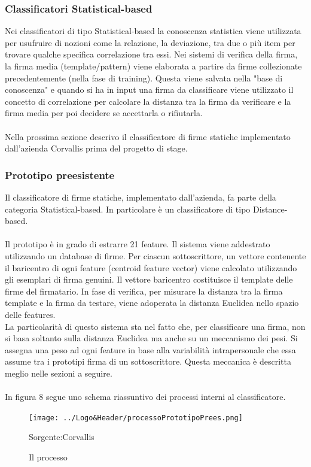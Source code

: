 \subsubsection*{Classificatori Statistical-based}
\label{2.1.3.2}
Nei classificatori di tipo Statistical-based la conoscenza statistica viene utilizzata per usufruire di nozioni come la relazione, la deviazione, tra due o più item per trovare qualche specifica correlazione tra essi. Nei sistemi di verifica della firma, la firma media (template/pattern) viene elaborata a partire da firme collezionate precedentemente (nella fase di training). Questa viene salvata nella "base di conoscenza" e quando si ha in input una firma da classificare viene utilizzato il concetto di correlazione per calcolare la distanza tra la firma da verificare e la firma media per poi decidere se accettarla o rifiutarla.\\\\
Nella prossima sezione descrivo il classificatore di firme statiche implementato dall'azienda Corvallis prima del progetto di stage.
\subsubsection{Prototipo preesistente}
\label{2.1.4}
Il classificatore di firme statiche, implementato dall'azienda, fa parte della categoria Statistical-based. In particolare è un classificatore di tipo Distance-based.\\\\
Il prototipo è in grado di estrarre 21 feature.
Il sistema viene addestrato utilizzando un database di firme. Per ciascun sottoscrittore, un vettore contenente il baricentro di ogni feature (centroid feature vector) viene calcolato utilizzando gli esemplari di firma genuini. Il vettore baricentro costituisce il template delle firme del firmatario. In fase di verifica, per misurare la distanza tra la firma template e la firma da testare, viene adoperata la distanza Euclidea nello spazio delle features.\\
La particolarità di questo sistema sta nel fatto che, per classificare una firma, non si basa soltanto sulla distanza Euclidea ma anche su un meccanismo dei pesi. Si assegna una peso ad ogni feature in base alla variabilità intrapersonale che essa assume tra i prototipi firma di un sottoscrittore. Questa meccanica è descritta meglio nelle sezioni a seguire.\\\\
In figura 8 segue uno schema riassuntivo dei processi interni al classificatore.
\begin{figure}[H]
\centering
\texttt{[image: ../Logo\&Header/processoPrototipoPrees.png]}
\caption{Il processo}Sorgente:Corvallis
\end{figure}


